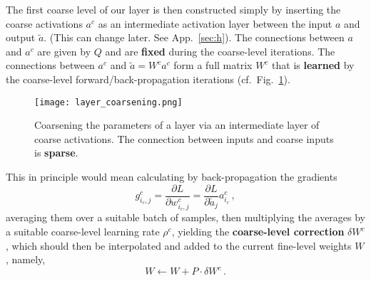\documentclass{article} %
\begin{document}
The first coarse level of our layer is then constructed simply by inserting the coarse activations $a^c$ as an intermediate activation layer between the input $a$ and output $\tilde{a}$. (This can change later. See App.~\ref{sec:h}). The connections between $a$ and $a^c$ are given by $Q$ and are \textbf{fixed} during the coarse-level iterations. The connections between $a^{c}$ and $\tilde{a} = W^c a^c$ form a full matrix $W^c$ that is \textbf{learned} by the coarse-level forward/back-propagation iterations (cf.~Fig.~\ref{fig:layer_coarsening}). 
\begin{figure}[htbp]
  \centering
  \texttt{[image: layer\_coarsening.png]}
  \caption{Coarsening the parameters of a layer via an intermediate layer of coarse activations. The connection between inputs and coarse inputs is \textbf{sparse}.}
  \label{fig:layer_coarsening}
\end{figure}
This in principle would mean calculating by back-propagation the gradients
\begin{equation}
	g^c_{i_c,j} = \frac{\partial L}{\partial w^c_{i_c,j}} =
	\frac{\partial L}{\partial \tilde{a}_j} a^c_{i_c}\,,
	\label{gc}
\end{equation}
averaging them over a suitable batch of samples, then multiplying the averages by a suitable coarse-level learning rate $\rho^c$, yielding the \textbf{coarse-level correction} $\delta W^c$, which should then be interpolated and added to the current fine-level weights $W$, namely,
\begin{equation}
	W \longleftarrow W + P \cdot \delta W^c\,.
	\label{w_correction}
\end{equation}
\end{document}
